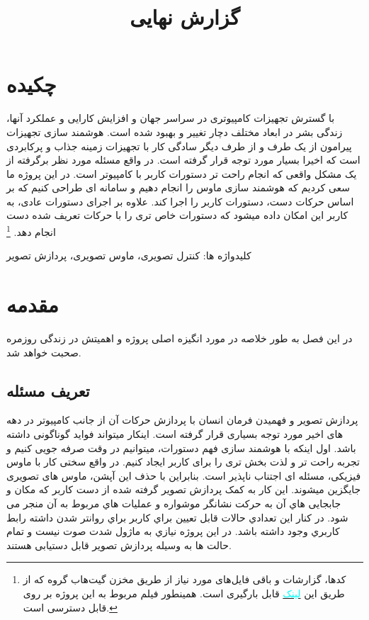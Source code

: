\documentclass{article}
\title{گزارش نهایی}
\begin{document}
\heading
\header
\allowdisplaybreaks

\section{چکیده}

با گسترش تجهیزات کامپیوتری در سراسر جهان و افزایش کارایی و عملکرد آنها، زندگی بشر در ابعاد مختلف دچار تغییر و بهبود شده است. هوشمند سازی تجهیزات پیرامون از یک طرف و از طرف دیگر سادگی کار با تجهیزات زمینه جذاب و پرکابردی است که اخیرا بسیار مورد توجه قرار گرفته است. در واقع مسئله مورد نظر برگرفته از یک مشکل واقعی که انجام راحت تر دستورات کاربر با کامپیوتر است. در این پروژه ما سعی کردیم که هوشمند سازی ماوس را انجام دهیم و سامانه ای طراحی کنیم که بر اساس حرکات دست، دستورات کاربر را اجرا کند. علاوه بر اجرای دستورات عادی، به کاربر این امکان داده میشود که دستورات خاص تری را با حرکات تعریف شده دست انجام دهد.
\footnote{کد‌ها، گزارشات و باقی‌ فایل‌های مورد نیاز از طریق مخزن گیت‌هاب گروه که از طریق این 
\href{https://github.com/Sharif-University-ESRLab/project-team-3}{\textcolor{cyan}{لینک}}
قابل بارگیری‌ است.
همینطور فیلم مربوط به این پروژه بر روی
\href{https://www.aparat.com/v/ymRzw}{\color{cyan}{آپارات}}
قابل دسترسی است.
}

\vspace{0.5cm}

کلیدواژه ها: کنترل تصویری، ماوس تصویری، پردازش تصویر

\pagebreak
\tableofcontents
\pagebreak

\section{مقدمه}
در این فصل به طور خلاصه در مورد انگیزه اصلی پروژه و اهمیتش در زندگی روزمره صحبت خواهد شد.

\subsection{تعریف مسئله}
پردازش تصویر و فهمیدن فرمان انسان با پردازش حرکات آن از جانب کامپیوتر در دهه های اخیر مورد توجه بسیاری قرار گرفته است. اینکار میتواند فواید گوناگونی داشته باشد. اول اینکه با هوشمند سازی فهم دستورات، میتوانیم در وقت صرفه جویی کنیم و تجربه راحت تر و لذت بخش تری را برای کاربر ایجاد کنیم. در واقع سختی کار با ماوس فیزیکی، مسئله ای اجتناب ناپذیر است. بنابراین با حذف این آپشن، ماوس های تصویری جایگزین میشوند. این کار به کمک پردازش تصویر گرفته شده از دست کاربر که مکان و جابجایی هاي آن به حرکت نشانگر موشواره و عملیات هاي مربوط به آن منجر می شود. در کنار این تعدادي حالات قابل تعیین براي کاربر براي روانتر شدن داشته رابط کاربري وجود داشته باشد. در این پروژه نیازي به ماژول شدت صوت نیست و تمام حالت ها به وسیله پردازش تصویر قابل دستیابی هستند. 
\end{document}
